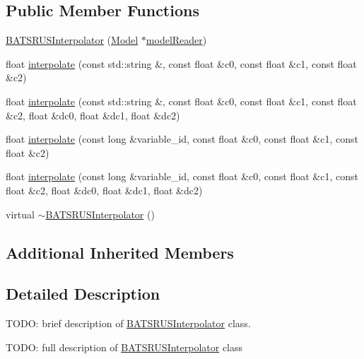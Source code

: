 \subsection*{Public Member Functions}
\begin{DoxyCompactItemize}
\item 
\hyperlink{classccmc_1_1_b_a_t_s_r_u_s_interpolator_a13070c4466906bd409bb948bc378b64c}{B\-A\-T\-S\-R\-U\-S\-Interpolator} (\hyperlink{classccmc_1_1_model}{Model} $\ast$\hyperlink{classccmc_1_1_interpolator_afee5bb61e5d5a0a7b9152c6f74378c4a}{model\-Reader})
\item 
float \hyperlink{classccmc_1_1_b_a_t_s_r_u_s_interpolator_a9a9a185e83767d1bfc9b1bb584cd250f}{interpolate} (const std\-::string \&, const float \&c0, const float \&c1, const float \&c2)
\item 
float \hyperlink{classccmc_1_1_b_a_t_s_r_u_s_interpolator_ab5e4f01a95ee9b9d1a58868806d8fa42}{interpolate} (const std\-::string \&, const float \&c0, const float \&c1, const float \&c2, float \&dc0, float \&dc1, float \&dc2)
\item 
float \hyperlink{classccmc_1_1_b_a_t_s_r_u_s_interpolator_ae6577b5c388106e6d26f1c890a30cba8}{interpolate} (const long \&variable\-\_\-id, const float \&c0, const float \&c1, const float \&c2)
\item 
float \hyperlink{classccmc_1_1_b_a_t_s_r_u_s_interpolator_a8bb4e9b10064a516192c771462673b09}{interpolate} (const long \&variable\-\_\-id, const float \&c0, const float \&c1, const float \&c2, float \&dc0, float \&dc1, float \&dc2)
\item 
virtual \hyperlink{classccmc_1_1_b_a_t_s_r_u_s_interpolator_a5c188e0bf30c66f3aadc34d1c2711937}{$\sim$\-B\-A\-T\-S\-R\-U\-S\-Interpolator} ()
\end{DoxyCompactItemize}
\subsection*{Additional Inherited Members}


\subsection{Detailed Description}
T\-O\-D\-O\-: brief description of \hyperlink{classccmc_1_1_b_a_t_s_r_u_s_interpolator}{B\-A\-T\-S\-R\-U\-S\-Interpolator} class. 

T\-O\-D\-O\-: full description of \hyperlink{classccmc_1_1_b_a_t_s_r_u_s_interpolator}{B\-A\-T\-S\-R\-U\-S\-Interpolator} class 

